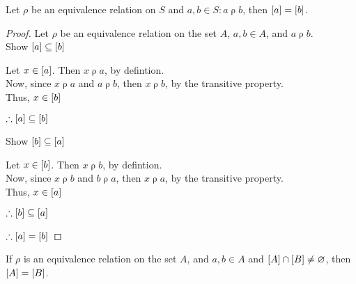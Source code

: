 \documentclass{report}
\begin{document}
\Lemma Let $\rho$ be an equivalence relation on $S$ and $a,b\in S: a\mathbin{\rho}b$, then $\left[ a \right]=\left[ b \right]$.
\begin{proof}
	Let $\rho$ be an equivalence relation on the set $A$, $a,b\in A$, and $a\mathbin\rho b$. \\
	Show $\left[ a \right]\subseteq\left[ b \right]$
	\begin{list}{}{\rightmargin\leftmargin\topsep=4pt}\item
		Let $x\in\left[ a \right]$. Then $x\mathbin\rho a$, by defintion. \\
		Now, since $x\mathbin\rho a$ and $a\mathbin\rho b$, then $x\mathbin\rho b$, by the transitive property. \\
		Thus, $x\in\left[ b \right]$

		$\therefore\left[ a \right]\subseteq\left[ b \right]$
	\end{list}
	Show $\left[ b \right]\subseteq\left[ a \right]$
	\begin{list}{}{\rightmargin\leftmargin\topsep=4pt}\item
		Let $x\in\left[ b \right]$. Then $x\mathbin\rho b$, by defintion. \\
		Now, since $x\mathbin\rho b$ and $b\mathbin\rho a$, then $x\mathbin\rho a$, by the transitive property. \\
		Thus, $x\in\left[ a \right]$

		$\therefore\left[ b \right]\subseteq\left[ a \right]$
	\end{list}
	$\therefore \left[ a \right]=\left[ b \right]$
\end{proof}

\Lemma If $\rho$ is an equivalence relation on the set $A$, and $a,b\in A$ and $\left[ A \right]\cap\left[ B \right]\neq\varnothing$, then $\left[ A \right]=\left[ B \right]$.
\end{document}

